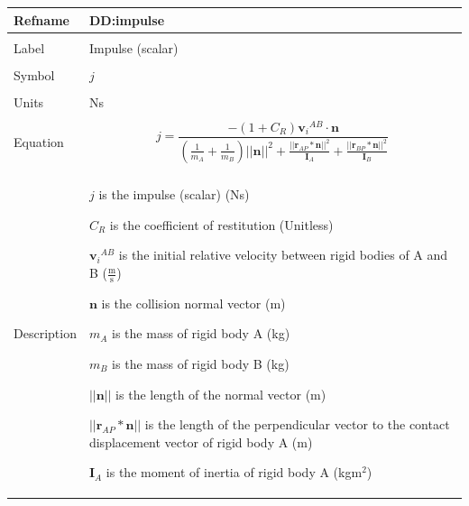 \documentclass[12pt]{article}
\begin{document}
\noindent \begin{minipage}{\textwidth}
          \begin{tabular}{>{\raggedright}p{}>{\raggedright\arraybackslash}p{}}
          \toprule \textbf{Refname} & \textbf{DD:impulse}
          \label{DD:impulse}
          \\ \midrule \\
          Label & Impulse (scalar)
          \\ \midrule \\
          Symbol & $j$
          \\ \midrule \\
          Units & Ns
          \\ \midrule \\
          Equation & \begin{displaymath}
                     j=\frac{-\left(1+{C_{R}}\right) {{\mathbf{v}_{i}}^{AB}}\cdot{}\mathbf{n}}{\left(\frac{1}{{m_{A}}}+\frac{1}{{m_{B}}}\right) ||\mathbf{n}||^{2}+\frac{||{\mathbf{r}_{AP}}*\mathbf{n}||^{2}}{{\mathbf{I}_{A}}}+\frac{||{\mathbf{r}_{BP}}*\mathbf{n}||^{2}}{{\mathbf{I}_{B}}}}
                     \end{displaymath}
          \\ \midrule \\
          Description & \begin{symbDescription}
                        \item{$j$ is the impulse (scalar) (Ns)}
                        \item{${C_{R}}$ is the coefficient of restitution (Unitless)}
                        \item{${{\mathbf{v}_{i}}^{AB}}$ is the initial relative velocity between rigid bodies of A and B ($\frac{\text{m}}{\text{s}}$)}
                        \item{$\mathbf{n}$ is the collision normal vector (m)}
                        \item{${m_{A}}$ is the mass of rigid body A (kg)}
                        \item{${m_{B}}$ is the mass of rigid body B (kg)}
                        \item{$||\mathbf{n}||$ is the length of the normal vector (m)}
                        \item{$||{\mathbf{r}_{AP}}*\mathbf{n}||$ is the length of the perpendicular vector to the contact displacement vector of rigid body A (m)}
                        \item{${\mathbf{I}_{A}}$ is the moment of inertia of rigid body A (kg$\text{m}^{2}$)}

\end{symbDescription}
\end{tabular}
\end{minipage}
\end{document}
